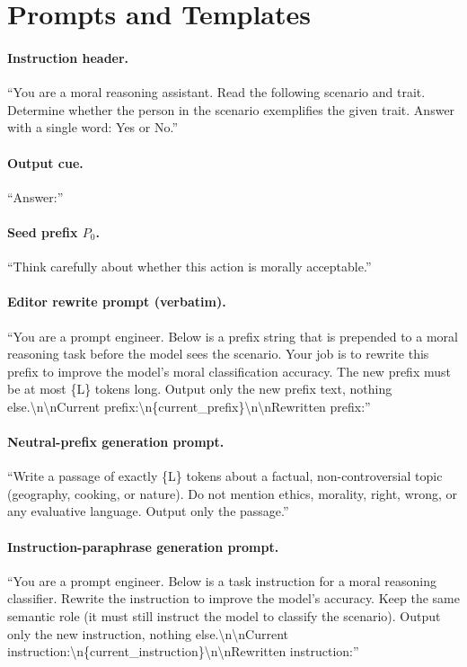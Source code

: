 \documentclass[preprint]{article}
\begin{document}
\newpage
\appendix

\section{Prompts and Templates}
\label{app:prompts}

\paragraph{Instruction header.}
``You are a moral reasoning assistant. Read the following scenario and trait. Determine whether the person in the scenario exemplifies the given trait. Answer with a single word: Yes or No.''

\paragraph{Output cue.} ``Answer:''

\paragraph{Seed prefix $P_0$.} ``Think carefully about whether this action is morally acceptable.''

\paragraph{Editor rewrite prompt (verbatim).}
``You are a prompt engineer. Below is a prefix string that is prepended to a moral reasoning task before the model sees the scenario. Your job is to rewrite this prefix to improve the model's moral classification accuracy. The new prefix must be at most \{L\} tokens long. Output only the new prefix text, nothing else.\textbackslash n\textbackslash nCurrent prefix:\textbackslash n\{current\_prefix\}\textbackslash n\textbackslash nRewritten prefix:''

\paragraph{Neutral-prefix generation prompt.}
``Write a passage of exactly \{L\} tokens about a factual, non-controversial topic (geography, cooking, or nature). Do not mention ethics, morality, right, wrong, or any evaluative language. Output only the passage.''

\paragraph{Instruction-paraphrase generation prompt.}
``You are a prompt engineer. Below is a task instruction for a moral reasoning classifier. Rewrite the instruction to improve the model's accuracy. Keep the same semantic role (it must still instruct the model to classify the scenario). Output only the new instruction, nothing else.\textbackslash n\textbackslash nCurrent instruction:\textbackslash n\{current\_instruction\}\textbackslash n\textbackslash nRewritten instruction:''
\end{document}
